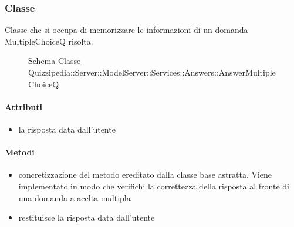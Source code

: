 \subsubsection{Classe }
Classe che si occupa di memorizzare le informazioni di un domanda MultipleChoiceQ risolta.
\begin{figure}[H]
\centering
\noindent{}
\caption[Schema Classe AnswerMultipleChoiceQ]{Schema Classe Quizzipedia::Server::ModelServer::Services::Answers::AnswerMultipleChoiceQ}
\end{figure}
\paragraph{Attributi}
\begin{itemize}
\item {}
\newline
la risposta data dall'utente
\end{itemize}
\paragraph{Metodi}
\begin{itemize}
\item {}
\newline
concretizzazione del metodo ereditato dalla classe base astratta. Viene implementato in modo che verifichi la correttezza della risposta al fronte di una domanda a acelta multipla
\newline
\item {}
\newline
restituisce la risposta data dall'utente
\newline
\end{itemize}
